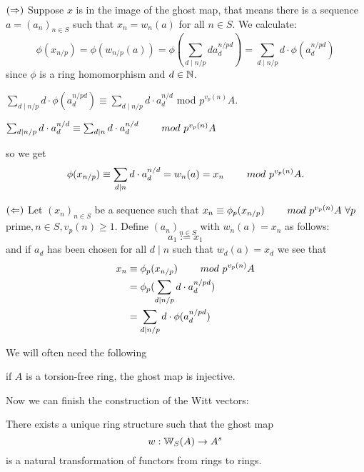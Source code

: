\begin{bigproof}
    $(\Rightarrow)$ Suppose $x$ is in the image of the ghost map, that means there is a sequence 
    $a = (a_n)_{n \in S}$ such that $x_n = w_n(a)$ for all $n \in S$. 
    We calculate:
    \[
        \phi(x_{n/p}) = \phi(w_{n/p}(a)) = \phi(\sum_{d \mid n/p} d a_d^{n/pd}) =
        \sum_{d \mid n/p} d \cdot \phi(a_d^{n/pd}) 
    \] 
    since $\phi$ is a ring homomorphism and $d \in \mathbb{N}$.
    \begin{claim}
        $\sum_{d \mid n/p} d \cdot \phi(a_d^{n/pd}) \equiv 
        \sum_{d \mid n/p} d \cdot a_d^{n/d}$ \hskip8mm mod $p^{v_p(n)}A$.
    \end{claim}
    \begin{smallproof}
        \todo{}
    \end{smallproof}
    
    \begin{claim}
        $\sum_{d \mid n/p} d \cdot a_d^{n/d} \equiv 
        \sum_{d \mid n} d \cdot a_d^{n/d} \hskip8mm mod \ p^{v_p(n)}A$
    \end{claim} 
    \begin{smallproof}
        \todo{}
    \end{smallproof}
    so we get
    \[
        \phi(x_{n/p}) \equiv \sum_{d \mid n} d \cdot a_d^{n/d} = w_n(a) = x_n \hskip8mm mod \ p^{v_p(n)}A.
        \]
    
    $(\Leftarrow)$ Let $(x_n)_{n \in S}$ be a sequence such that 
    $x_n \equiv \phi_p(x_{n/p}) \hskip8mm mod \ p^{v_p(n)}A \ \forall p\ $prime$, n\in S, v_p(n) \geqslant 1.$
    Define $(a_n)_{n \in S}$ with $w_n(a) = x_n$ as follows:
    \[a_1 := x_1\]
    and if $a_d$ has been chosen for all $d \mid n$ such that $w_d(a) = x_d$ we see that
    \begin{align*}
            x_n &\equiv \phi_p(x_{n/p}) \hskip8mm mod \ p^{v_p(n)}A \\
                &= \phi_p(\sum_{d \mid n/p} d \cdot a_d^{n/pd}) \\
                &= \sum_{d \mid n/p} d \cdot \phi(a_d^{n/pd})
    \end{align*}
\end{bigproof}
We will often need the following
\begin{lemma} \label{lem: injective ghost map}
    if $A$ is a torsion-free ring, the ghost map is injective.
\end{lemma}
Now we can finish the construction of the Witt vectors:
\begin{theorem} \label{thm: existence of witt vectors}
    There exists a unique ring structure such that the ghost map 
    \[
      w:\mathbb{W}_S(A) \to A^s  
    \]
    is a natural transformation of functors from rings to rings.
\end{theorem}
